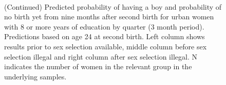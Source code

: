 \documentclass[12pt,letterpaper]{article}
\begin{document}
\begin{figure}[htpb]
{\begin{minipage}{0.31\textwidth}
        \captionsetup[subfigure]{labelformat=empty,position=top,captionskip=-1pt,farskip=-0.5pt}
        \\
        \captionsetup[subfigure]{labelformat=parens}
    \end{minipage}
}
\setcounter{subfigure}{6}
\caption{(Continued) Predicted probability of having a boy and probability of
no birth yet from nine months after second birth for urban 
women with 8 or more years of education by quarter (3 month period). 
Predictions based on age 24 at second birth.
Left column shows results prior to sex selection available, middle column before
sex selection illegal and right column after sex selection illegal.
N indicates the number of women in the relevant group in the underlying samples.
}
\end{figure}
\end{document}
